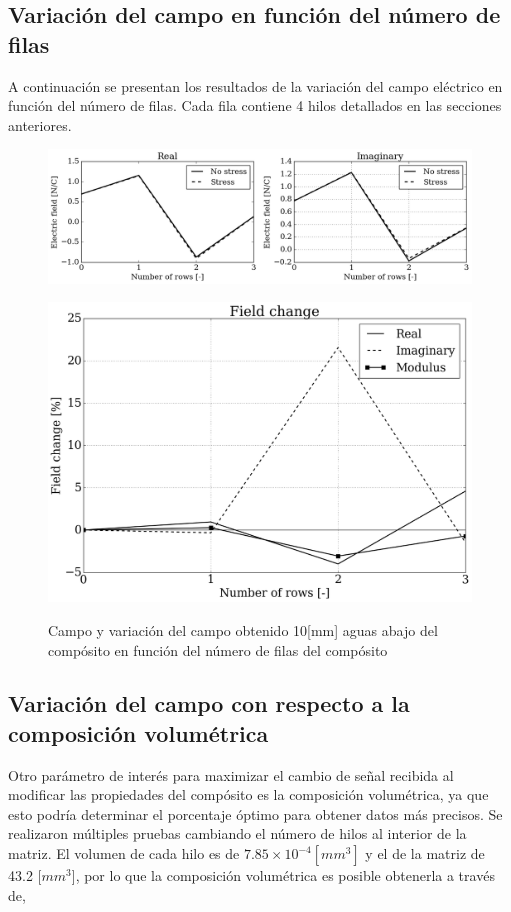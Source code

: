 \documentclass[12pt,letterpaper]{article}
\numberwithin{equation}{section}
\begin{document}
\subsection{Variación del campo en función del número de filas}

A continuación se presentan los resultados de la variación del campo eléctrico en función del número de filas. Cada fila contiene 4 hilos detallados en las secciones anteriores.

\begin{figure}[H]
	\centering\includegraphics[scale=0.6]{Imagenes/block_comparision.png}\\
\end{figure} 
\begin{figure}[H]
	\centering\includegraphics[scale=0.35]{Imagenes/block_change.png}\\
	\caption{Campo y variación del campo obtenido 10[mm] aguas abajo del compósito en función del número de filas del compósito}
	\label{fig:fieldblockchange}
\end{figure}

\subsection{Variación del campo con respecto a la composición volumétrica}
Otro parámetro de interés para maximizar el cambio de señal recibida al modificar las propiedades del compósito es la composición volumétrica, ya que esto podría determinar el porcentaje óptimo para obtener datos más precisos.
Se realizaron múltiples pruebas cambiando el número de hilos al interior de la matriz. El volumen de cada hilo es de $7.85\times 10^{-4}[mm^3]$ y el de la matriz de 43.2 [$mm^3$], por lo que la composición volumétrica es posible obtenerla a través de,
\end{document}
